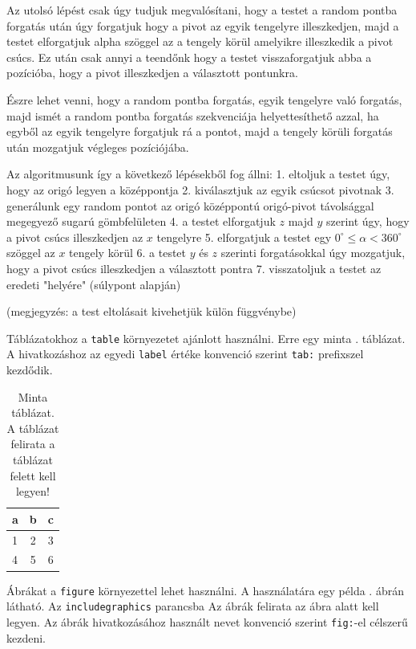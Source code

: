 Az utolsó lépést csak úgy tudjuk megvalósítani, hogy a testet a random pontba forgatás után úgy forgatjuk hogy a pivot az egyik tengelyre illeszkedjen, majd a testet elforgatjuk alpha szöggel az a tengely körül amelyikre illeszkedik a pivot csúcs. Ez után csak annyi a teendőnk hogy a testet visszaforgatjuk abba a pozícióba, hogy a pivot illeszkedjen a választott pontunkra.

Észre lehet venni, hogy a random pontba forgatás, egyik tengelyre való forgatás, majd ismét a random pontba forgatás szekvenciája helyettesíthető azzal, ha egyből az egyik tengelyre forgatjuk rá a pontot, majd a tengely körüli forgatás  után mozgatjuk végleges pozíciójába.

Az algoritmusunk így a következő lépésekből fog állni:
1. eltoljuk a testet úgy, hogy az origó legyen a középpontja
2. kiválasztjuk az egyik csúcsot pivotnak
3. generálunk egy random pontot az origó középpontú origó-pivot távolsággal megegyező sugarú gömbfelületen
4. a testet elforgatjuk $z$ majd $y$ szerint úgy, hogy a pivot csúcs illeszkedjen az $x$ tengelyre
5. elforgatjuk a testet egy $0^\circ \leq \alpha < 360^\circ$ szöggel az $x$ tengely körül
6. a testet $y$ és $z$ szerinti forgatásokkal úgy mozgatjuk, hogy a pivot csúcs illeszkedjen a választott pontra
7. visszatoljuk a testet az eredeti "helyére" (súlypont alapján)

(megjegyzés: a test eltolásait kivehetjük külön függvénybe)


Táblázatokhoz a \texttt{table} környezetet ajánlott használni.
Erre egy minta . táblázat.
A hivatkozáshoz az egyedi \texttt{label} értéke konvenció szerint \texttt{tab:} prefixszel kezdődik.

\begin{table}[h]
\centering
\caption{Minta táblázat. A táblázat felirata a táblázat felett kell legyen!}
\label{tab:minta}
\begin{tabular}{l|c|c|}
a & b & c \\
\hline
1 & 2 & 3 \\
4 & 5 & 6 \\
\hline
\end{tabular}
\end{table}


Ábrákat a \texttt{figure} környezettel lehet használni.
A használatára egy példa . ábrán látható.
Az \texttt{includegraphics} parancsba 
Az ábrák felirata az ábra alatt kell legyen.
Az ábrák hivatkozásához használt nevet konvenció szerint \texttt{fig:}-el célszerű kezdeni.

